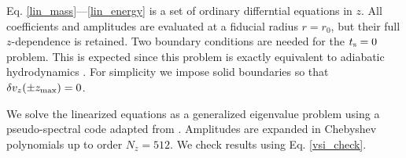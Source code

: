 
Eq. \ref{lin_mass}---\ref{lin_energy} is a set of ordinary
differntial equations in $z$. All coefficients and amplitudes are
evaluated at a fiducial radius $r=r_0$, but their full $z$-dependence
is retained.  Two boundary conditions are needed for the $t_\mathrm{s}=0$
problem. This is expected since this problem is exactly equivalent to
 adiabatic hydrodynamics \citep[e.g.][]{lubow93}. For simplicity
we impose solid boundaries so that $\delta v_z(\pm z_\mathrm{max})=0$. 

We solve the linearized equations as a generalized eigenvalue problem 
using a pseudo-spectral code adapted from \cite{lin15}. Amplitudes 
are expanded in Chebyshev polynomials up to order $N_z=512$. We check
results using Eq. \ref{vsi_check}.    





























